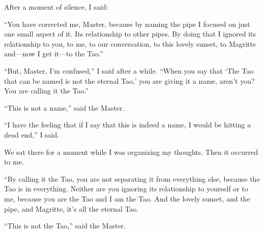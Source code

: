 \documentclass{memoir}
\begin{document}
After a moment of silence, I said:

``You have corrected me, Master, because by naming the pipe I focused on just one small aspect of it. Its relationship to other pipes. By doing that I ignored its relationship to you, to me, to our conversation, to this lovely sunset, to Magritte and---now I get it---to the Tao.''

``But, Master, I'm confused,'' I said after a while. ``When you say that `The Tao that can be named is not the eternal Tao,' you are giving it a name, aren't you? You are calling it the Tao.''

``This is not a name,'' said the Master.

``I have the feeling that if I say that this is indeed a name, I would be hitting a dead end,'' I said. 

We sat there for a moment while I was organizing my thoughts. Then it occurred to me.

``By calling it the Tao, you are not separating it from everything else, because the Tao is in everything. Neither are you ignoring its relationship to yourself or to me, because you are the Tao and I am the Tao. And the lovely sunset, and the pipe, and Magritte, it's all the eternal Tao.

``This is not the Tao,'' said the Master.
\end{document}
